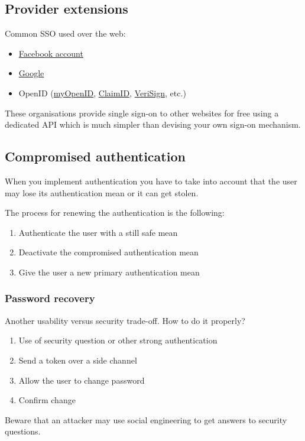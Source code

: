 \subsection{Provider extensions}
Common SSO used over the web:
\begin{itemize}
\item \href{http://www.facebook.com/}{Facebook account}
\item \href{http://google.com/}{Google}
\item OpenID (\href{http://myopenid.com/}{myOpenID},
\href{http://claimid.com/}{ClaimID},
\href{http://pip.verisignlabs.com/}{VeriSign}, etc.)
\end{itemize}
These organisations provide single sign-on to other websites for free
using a dedicated API which is much simpler than devising your own
sign-on mechanism.

\subsection{Compromised authentication}
When you implement authentication you have to take into account that the user
may lose its authentication mean or it can get stolen.

The process for renewing the authentication is the following:
\begin{enumerate}
\item Authenticate the user with a still safe mean
\item Deactivate the compromised authentication mean
\item Give the user a new primary authentication mean
\end{enumerate}

\subsubsection*{Password recovery}
Another usability versus security trade-off.
How to do it properly?
\begin{enumerate}
\item Use of security question or other strong authentication
\item Send a token over a side channel
\item Allow the user to change password
\item Confirm change
\end{enumerate}
Beware that an attacker may use social engineering to get answers to security
questions.

